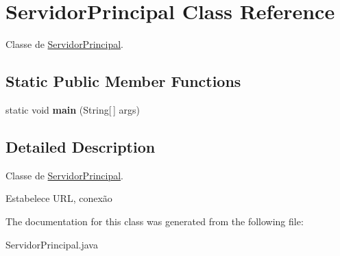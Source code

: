 \hypertarget{classServidorPrincipal}{\section{Servidor\-Principal Class Reference}
\label{classServidorPrincipal}
}


Classe de \hyperlink{classServidorPrincipal}{Servidor\-Principal}.  


\subsection*{Static Public Member Functions}
\begin{DoxyCompactItemize}
\item 
\hypertarget{classServidorPrincipal_a311e49afdab7d66fa7ca73bb11dfb8b3}{static void {\bfseries main} (String\mbox{[}$\,$\mbox{]} args)}\label{classServidorPrincipal_a311e49afdab7d66fa7ca73bb11dfb8b3}

\end{DoxyCompactItemize}


\subsection{Detailed Description}
Classe de \hyperlink{classServidorPrincipal}{Servidor\-Principal}. 

Estabelece U\-R\-L, conexão 

The documentation for this class was generated from the following file\-:\begin{DoxyCompactItemize}
\item 
Servidor\-Principal.\-java\end{DoxyCompactItemize}
